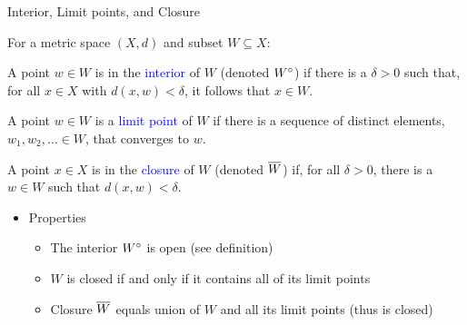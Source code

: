 \documentclass[10pt,english]{beamer}
\begin{document}
\begin{frame}{Interior, Limit points, and Closure}

For a metric space $(X,d)$ and subset $W \subseteq X$:

\begin{definition}
A point $w\in W$ is in the \textcolor{blue}{interior} of $W$ (denoted ${W}^{\circ}$) if there is a $\delta >0$ such that, for all $x\in X$ with $d(x,w)<\delta$, it follows that $x\in W$.
\end{definition}

\begin{definition}
A point $w\in W$ is a \textcolor{blue}{limit point} of $W$ if there is a sequence of distinct elements, $w_1,w_2,\ldots\in W$, that converges to $w$.
\end{definition}

\begin{definition}
A point $x\in X$ is in the \textcolor{blue}{closure} of $W$ (denoted $\overline{W}$) if, for all $\delta >0$, there is a $w\in W$ such that $d(x,w)<\delta$.
\end{definition}

\begin{itemize}
\setlength\itemsep{3mm}
\item<1-> Properties \vspace{1mm}
\begin{itemize} 
  \setlength\itemsep{1.5mm}
  \item The interior ${W}^{\circ}$ is open (see definition)
  \item $W$ is closed if and only if it contains all of its limit points
  \item Closure $\overline{W}$ equals union of $W$ and all its limit points (thus is closed)
\end{itemize}
\end{itemize}

\end{frame}
\end{document}

